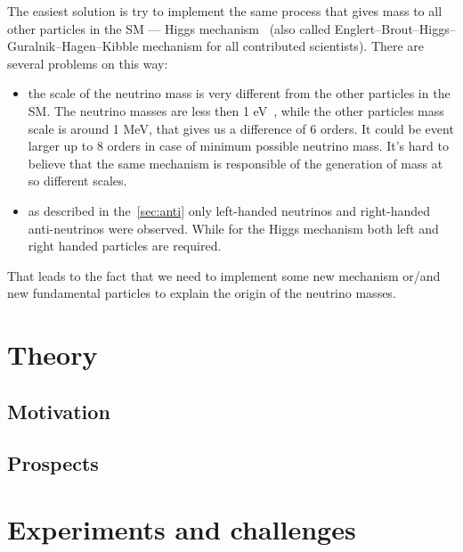 \documentclass[../main.tex]{subfiles}
\begin{document}
The easiest solution is try to implement the same process that gives mass to all other particles in the SM --- Higgs mechanism~\cite{Higgs1964} (also called Englert–Brout–Higgs–Guralnik–Hagen–Kibble mechanism for all contributed scientists). There are several problems on this way:
\begin{itemize}
  \item the scale of the neutrino mass is very different from the other particles in the SM. The neutrino masses are less then 1 eV~\cite{Aker2019}, while the other particles mass scale is around 1 MeV, that gives us a difference of 6 orders. It could be event larger up to 8 orders in case of minimum possible neutrino mass. It's hard to believe that the same mechanism is responsible of the generation of mass at so different scales.
  \item as described in the~\autoref{sec:anti} only left-handed neutrinos and right-handed anti-neutrinos were observed. While for the Higgs mechanism both left and right handed particles are required.
\end{itemize}

That leads to the fact that we need to implement some new mechanism or/and new fundamental particles to explain the origin of the neutrino masses.



\section{Theory}

\subsection{Motivation}

\subsection{Prospects}


\section{Experiments and challenges}
\end{document}
